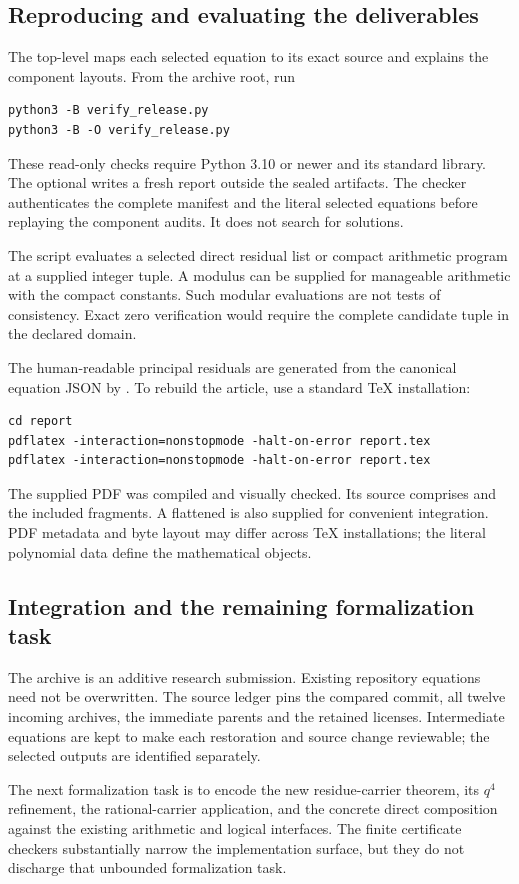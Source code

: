 \subsection{Reproducing and evaluating the deliverables}

The top-level  maps each selected equation to its exact
source and explains the component layouts. From the archive root,
run
\begin{verbatim}
python3 -B verify_release.py
python3 -B -O verify_release.py
\end{verbatim}
These read-only checks require Python 3.10 or newer and its standard
library. The optional  writes a fresh report
outside the sealed artifacts. The checker authenticates the complete
manifest and the literal selected equations before replaying the
component audits. It does not search for solutions.

The script  evaluates a selected direct residual list
or compact arithmetic program at a supplied integer tuple. A modulus
can be supplied for manageable arithmetic with the compact constants.
Such modular evaluations are not tests of consistency. Exact zero
verification would require the complete candidate tuple in the declared
domain.

The human-readable principal residuals are generated from the canonical
equation JSON by . To rebuild the article,
use a standard TeX installation:
\begin{verbatim}
cd report
pdflatex -interaction=nonstopmode -halt-on-error report.tex
pdflatex -interaction=nonstopmode -halt-on-error report.tex
\end{verbatim}
The supplied PDF was compiled and visually checked. Its source comprises
 and the included  fragments. A flattened
 is also supplied for convenient integration.
PDF metadata and byte layout may differ across TeX installations;
the literal polynomial data define the mathematical objects.

\subsection{Integration and the remaining formalization task}

The archive is an additive research submission. Existing repository
equations need not be overwritten. The source ledger pins the compared
commit, all twelve incoming archives, the immediate parents and the
retained licenses. Intermediate equations are kept to make each
restoration and source change reviewable; the selected outputs are
identified separately.

The next formalization task is to encode the new residue-carrier theorem,
its $q^4$ refinement, the rational-carrier application, and the concrete
direct composition against the existing arithmetic and logical interfaces.
The finite certificate checkers substantially narrow the implementation
surface, but they do not discharge that unbounded formalization task.
